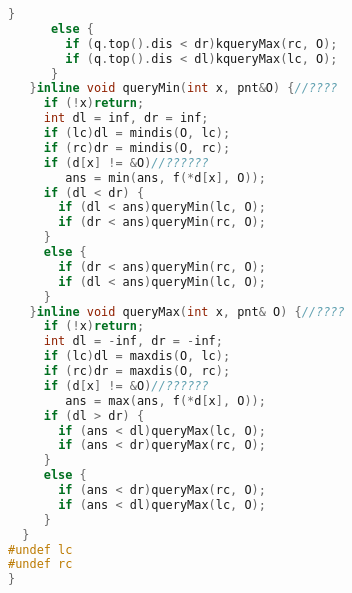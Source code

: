 \begin{lstlisting}[language=C++]
      }
      else { 
        if (q.top().dis < dr)kqueryMax(rc, O); 
        if (q.top().dis < dl)kqueryMax(lc, O); 
      }
   }inline void queryMin(int x, pnt&O) {//????
     if (!x)return;
     int dl = inf, dr = inf;
     if (lc)dl = mindis(O, lc);
     if (rc)dr = mindis(O, rc);
     if (d[x] != &O)//??????
        ans = min(ans, f(*d[x], O));
     if (dl < dr) {
       if (dl < ans)queryMin(lc, O);
       if (dr < ans)queryMin(rc, O);
     }
     else {
       if (dr < ans)queryMin(rc, O);
       if (dl < ans)queryMin(lc, O);
     }
   }inline void queryMax(int x, pnt& O) {//????
     if (!x)return;
     int dl = -inf, dr = -inf;
     if (lc)dl = maxdis(O, lc);
     if (rc)dr = maxdis(O, rc);
     if (d[x] != &O)//??????
        ans = max(ans, f(*d[x], O));
     if (dl > dr) {
       if (ans < dl)queryMax(lc, O);
       if (ans < dr)queryMax(rc, O);
     }
     else {
       if (ans < dr)queryMax(rc, O);
       if (ans < dl)queryMax(lc, O);
     }
  }
#undef lc
#undef rc 
}

\end{lstlisting}
